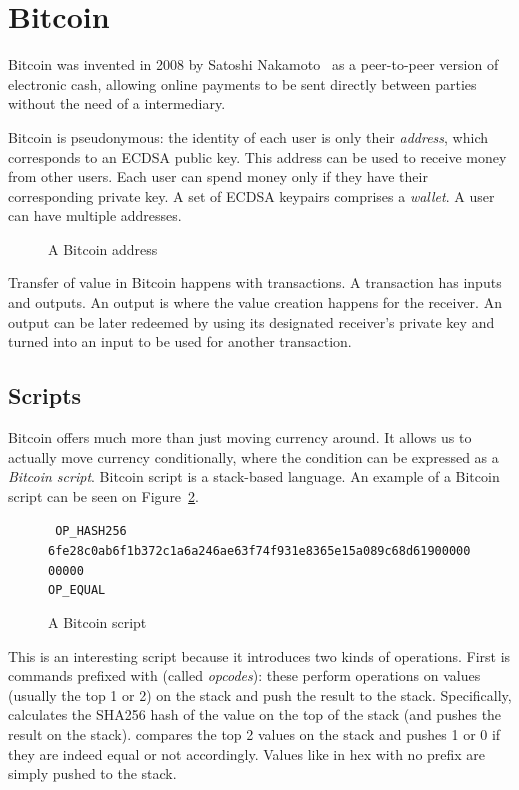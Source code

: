 \section{Bitcoin}
Bitcoin was invented in 2008 by Satoshi Nakamoto~\cite{bitcoin} as a peer-to-peer version of electronic cash, allowing online payments to be sent directly between parties without the need of a intermediary.

Bitcoin is pseudonymous: the identity of each user is only their \emph{address}, which corresponds to an ECDSA public key. This address can be used to receive money from other users. Each user can spend money only if they have their corresponding private key. A set of ECDSA keypairs comprises a \emph{wallet}. A user can have multiple addresses.

\begin{figure}
  \centering
  \caption{A Bitcoin address}
  \label{fig:address-example}
\end{figure}

Transfer of value in Bitcoin happens with transactions. A transaction has inputs and outputs. An output is where the value creation happens for the receiver. An output can be later redeemed by using its designated receiver's private key and turned into an input to be used for another transaction.

\subsection{Scripts}
Bitcoin offers much more than just moving currency around. It allows us to actually move currency conditionally, where the condition can be expressed as a \emph{Bitcoin script}. Bitcoin script is a stack-based language. An example of a Bitcoin script can be seen on Figure~\ref{fig:bitcoin-script}.

\begin{figure}
  \centering
  {
    \tt
    OP\_HASH256 \\
    6fe28c0ab6f1b372c1a6a246ae63f74f931e8365e15a089c68d6190000000000 \\
    OP\_EQUAL
  }
  \caption{A Bitcoin script}
  \label{fig:bitcoin-script}
\end{figure}

This is an interesting script because it introduces two kinds of operations. First is commands prefixed with  (called \emph{opcodes}): these perform operations on values (usually the top 1 or 2) on the stack and push the result to the stack. Specifically,  calculates the SHA256 hash of the value on the top of the stack (and pushes the result on the stack).  compares the top 2 values on the stack and pushes 1 or 0 if they are indeed equal or not accordingly. Values like  in hex with no  prefix are simply pushed to the stack.

